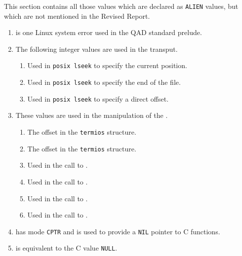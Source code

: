This section contains all those values which are declared as
\verb|ALIEN| values, but which are not mentioned in the Revised
Report.
\begin{enumerate}
\item {} is one Linux system error used in the QAD
standard prelude.
\item The following integer values are used in the transput.
\begin{enumerate}
\item {}\newline
Used in \verb|posix lseek| to specify the current position.
\item {}\newline
Used in \verb|posix lseek| to specify the end of the file.
\item {}\newline
Used in \verb|posix lseek| to specify a direct offset.
\end{enumerate}
\item These values are used in the manipulation of the .
\begin{enumerate}
\item {}\newline
The offset in the \verb|termios| structure.
\item {}\newline
The offset in the \verb|termios| structure.
\item {}\newline
Used in the call to .
\item {}\newline
Used in the call to .
\item {}\newline
Used in the call to .
\item {}\newline
Used in the call to .
\end{enumerate}
\item {} has mode \verb|CPTR| and is used to provide
a \verb|NIL| pointer to C functions.
\item {} is equivalent to the C value \verb|NULL|.

\end{enumerate}
